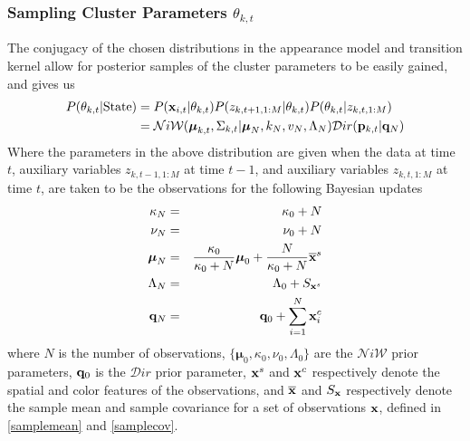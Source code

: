 \documentclass[smallcondensed, final]{svjour3}
\begin{document}
\subsubsection{Sampling Cluster Parameters $\theta_{k, t}$}
The conjugacy of the chosen distributions in the appearance model and transition kernel allow for posterior samples of the cluster parameters to be easily gained, and gives us
\begin{align}
\begin{split}
P(\theta_{k,t} | \text{State}) & = P(\bold{x}_{i,t} | \theta_{k,t}) P(z_{k,t+1,1:M} | \theta_{k,t})  P(\theta_{k,t} | z_{k,t,1:M}) \\
 & = \mathcal{N}i\mathcal{W}(\boldsymbol{\mu}_{k,t}, \Sigma_{k,t} | \boldsymbol{\mu}_{N}, k_{N}, v_{N}, \Lambda_{N})  \mathcal{D}ir( \bold{p}_{k,t} | \bold{q}_{N})
\end{split}
\end{align}
Where the parameters in the above distribution are given when the data at time $t$, auxiliary variables $z_{k,t-1,1:M}$ at time $t-1$, and auxiliary variables $z_{k,t,1:M}$ at time $t$, are taken to be the observations for the following Bayesian updates
\begin{eqnarray}
\label{bayesian_update_1}
\kappa_{N} &=& \kappa_{0} + N \\
\label{bayesian_update_2}
\nu_{N} &=& \nu_{0} + N \\
\label{bayesian_update_3}
\boldsymbol{\mu}_{N} &=& \frac{\kappa_{0}}{\kappa_{0}+N} \boldsymbol{\mu}_{0}  +  \frac{N}{\kappa_{0}+N} \overline{\bold{x}}^{s}\\
\Lambda_{N} &=& \Lambda_{0} + S_{\bold{x}^{s}}\\
\label{bayesian_update_4}
\bold{q}_{N} &=& \bold{q}_{0} + \sum_{i=1}^{N} \bold{x}_{i}^{c}
\end{eqnarray}
where $N$ is the number of observations, $\{ \boldsymbol{\mu}_{0}, \kappa_{0}, \nu_{0}, \Lambda_{0} \}$ are the $\mathcal{N}i\mathcal{W}$ prior parameters, $\bold{q}_{0}$ is the $\mathcal{D}ir$ prior parameter, $\bold{x}^{s}$ and $\bold{x}^{c}$ respectively denote the spatial and color features of the observations, and $\overline{\bold{x}}$ and $S_{\bold{x}}$ respectively denote the sample mean and sample covariance for a set of observations $\bold{x}$, defined in \eqref{samplemean} and \eqref{samplecov}.
\end{document}
